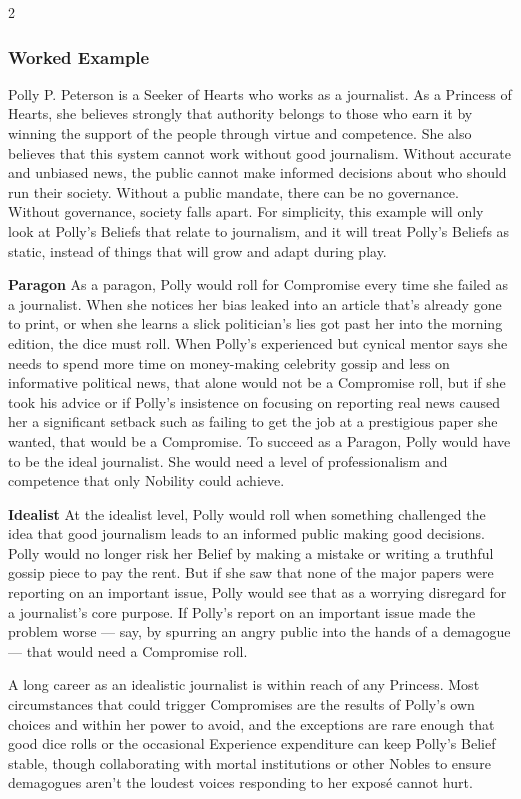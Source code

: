 \begin{multicols}{2}
\subsubsection*{Worked Example}

Polly P. Peterson is a Seeker of Hearts who works as a journalist. As a Princess of Hearts, she believes strongly that authority belongs to those who earn it by winning the support of the people through virtue and competence. She also believes that this system cannot work without good journalism. Without accurate and unbiased news, the public cannot make informed decisions about who should run their society. Without a public mandate, there can be no governance. Without governance, society falls apart. For simplicity, this example will only look at Polly's Beliefs that relate to journalism, and it will treat Polly's Beliefs as static, instead of things that will grow and adapt during play. 

\textbf{Paragon}
As a paragon, Polly would roll for Compromise every time she failed as a journalist. When she notices her bias leaked into an article that's already gone to print, or when she learns a slick politician's lies got past her into the morning edition, the dice must roll. When Polly's experienced but cynical mentor says she needs to spend more time on money-making celebrity gossip and less on informative political news, that alone would not be a Compromise roll, but if she took his advice or if Polly's insistence on focusing on reporting real news caused her a significant setback such as failing to get the job at a prestigious paper she wanted, that would be a Compromise. To succeed as a Paragon, Polly would have to be the ideal journalist. She would need a level of professionalism and competence that only Nobility could achieve. 

\textbf{Idealist}
At the idealist level, Polly would roll when something challenged the idea that good journalism leads to an informed public making good decisions. Polly would no longer risk her Belief by making a mistake or writing a truthful gossip piece to pay the rent. But if she saw that none of the major papers were reporting on an important issue, Polly would see that as a worrying disregard for a journalist's core purpose. If Polly's report on an important issue made the problem worse — say, by spurring an angry public into the hands of a demagogue — that would need a Compromise roll. 

A long career as an idealistic journalist is within reach of any Princess. Most circumstances that could trigger Compromises are the results of Polly's own choices and within her power to avoid, and the exceptions are rare enough that good dice rolls or the occasional Experience expenditure can keep Polly's Belief stable, though collaborating with mortal institutions or other Nobles to ensure demagogues aren't the loudest voices responding to her expos\'e cannot hurt.  


\end{multicols}
